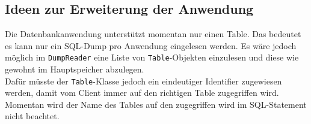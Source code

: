 \subsection{Ideen zur Erweiterung der Anwendung}
\label{Erweiterungen}
Die Datenbankanwendung unterstützt momentan nur einen Table. Das bedeutet es kann nur ein SQL-Dump pro Anwendung eingelesen werden.
Es wäre jedoch möglich im \texttt{DumpReader} eine Liste von \texttt{Table}-Objekten einzulesen und diese wie gewohnt im Hauptspeicher abzulegen.\\
Dafür müsste der \texttt{Table}-Klasse jedoch ein eindeutiger Identifier zugewiesen werden, damit vom Client immer auf den richtigen Table zugegriffen wird.
Momentan wird der Name des Tables auf den zugegriffen wird im SQL-Statement nicht beachtet.
